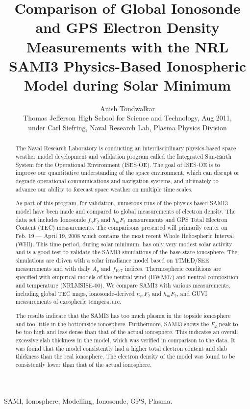 \documentclass[12pt]{IEEEtran}
\title
{Comparison of Global Ionosonde and GPS Electron Density Measurements with the NRL SAMI3 Physics-Based Ionospheric Model during Solar Minimum}
\author{Anish Tondwalkar
\\
{Thomas Jefferson High School for Science and Technology,
Aug 2011, \\ under Carl Siefring, Naval Research Lab, Plasma Physics Division}%
\vspace{-1cm}
}
\begin{document}
\maketitle
\begin{abstract}
  The Naval Research Laboratory is conducting an interdisciplinary physics-based space weather model development and validation program called the Integrated Sun-Earth System for the Operational Environment (ISES-OE). The goal of ISES-OE is to improve our quantitative understanding of the space environment, which can disrupt or degrade operational communications and navigation systems, and ultimately to advance our ability to forecast space weather on multiple time scales.
  
  As part of this program, for validation, numerous runs of the physics-based SAMI3 model have been made and compared to global measurements of electron density.  The data set includes  Ionosonde $f_oF_2$ and $h_mF_2$ measurements and GPS Total Electron Content (TEC) measurements. The comparisons presented will primarily center on Feb. 19 --- April 19, 2008 which contains the most recent Whole Heliospheric Interval (WHI).  This time period, during solar minimum, has only very modest solar activity and is a good test to validate the SAMI3 simulations of the base-state ionosphere. The simulations are driven with a solar irradiance model based on TIMED/SEE measurements and with daily $A_p$ and $f_{10.7}$ indices. Thermospheric conditions are specified with empirical models of the neutral wind (HWM07) and neutral composition and temperature (NRLMSISE-00). We compare SAMI3 with various measurements, including global TEC maps, ionosonde-derived $n_mF_2$ and $h_mF_2$, and GUVI measurements of exospheric temperature.
  
  The results indicate that the SAMI3 has too much plasma in the topside ionosphere and too little in the bottomside ionosphere. Furthermore, SAMI3 shows the $F_2$ peak to be too high and less dense than that of the actual ionosphere. This indicates an overall excessive slab thickness in the model, which was verified in comparison to the data.  It was found that the model consistently had a higher total electron content and slab thickness than the real ionosphere. The electron density of the model was found to be consistently lower than that of the 
actual ionosphere.
\end{abstract}
\begin{IEEEkeywords}
  SAMI, Ionosphere, Modelling, Ionosonde, GPS, Plasma.
\end{IEEEkeywords}
\end{document}
